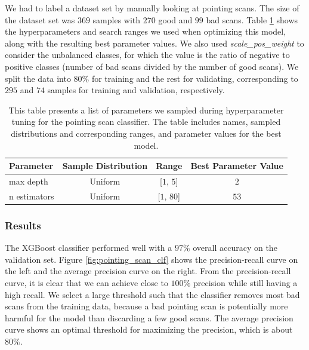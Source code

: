 We had to label a dataset set by manually looking at pointing scans.
The size of the dataset set was $369$ samples with $270$ good and $99$ bad scans.
Table \ref{tab:xgb_hyperparameters_clf} shows the hyperparameters and search ranges we used when optimizing this model, along with the resulting best parameter values.
We also used \textit{scale\_pos\_weight} to consider the unbalanced classes, for which the value is the ratio of negative to positive classes (number of bad scans divided by the number of good scans).
We split the data into $80\%$ for training and the rest for validating, corresponding to $295$ and $74$ samples for training and validation, respectively.

\begin{table}[H]
    \centering
    \caption[Hyperparemter search space XGBoost pointing scan classifier]{This table presents a list of parameters we sampled during hyperparameter tuning for the pointing scan classifier.
    The table includes names, sampled distributions and corresponding ranges, and parameter values for the best model.}
    \begin{tabular}{lccc}
        \toprule
        Parameter & Sample Distribution & Range & Best Parameter Value\\ \hline
        max depth & Uniform & [$1$, $5$] & $2$\\ 
        n estimators & Uniform & [$1$, $80$] & $53$\\ 
        \bottomrule
    \end{tabular}
    \label{tab:xgb_hyperparameters_clf}
\end{table}

\subsubsection{Results}
The XGBoost classifier performed well with a $97\%$ overall accuracy on the validation set.
Figure \ref{fig:pointing_scan_clf} shows the precision-recall curve on the left and the average precision curve on the right.
From the precision-recall curve, it is clear that we can achieve close to $100\%$ precision while still having a high recall.
We select a large threshold such that the classifier removes most bad scans from the training data,
because a bad pointing scan is potentially more harmful for the model than discarding a few good scans.
The average precision curve shows an optimal threshold for maximizing the precision, which is about $80\%$.\\

